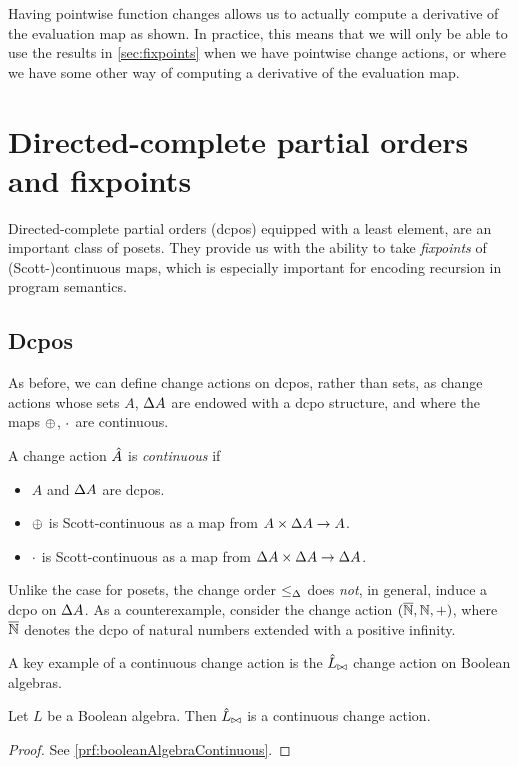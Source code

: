 Having pointwise function changes allows us to actually compute a derivative of the
evaluation map as shown. In practice, this means
that we will only be able to use the results in \cref{sec:fixpoints} when
we have pointwise change actions, or where we have some other way of computing
a derivative of the evaluation map. 

\section{Directed-complete partial orders and fixpoints}

Directed-complete partial orders (dcpos) equipped with a least element, are an
important class of posets. They provide us with the ability to take
\emph{fixpoints} of (Scott-)continuous maps, which is especially important for
encoding recursion in program semantics.

\subsection{Dcpos}
\label{sec:dcpos}

As before, we can define change actions on dcpos, rather than sets, as change
actions whose sets $A$, $\Delta A$ are endowed with a dcpo structure, and where
the maps $\oplus$, $\cdot$ are continuous.

\begin{defn}
  A change action $\hat{A}$ is \emph{continuous} if
  \begin{itemize}
    \item $A$ and $\Delta A$ are dcpos.
    \item $\oplus$ is Scott-continuous as a map from $A \times \Delta A \rightarrow A$.
    \item $\cdot$ is Scott-continuous as a map from $\Delta A \times \Delta A \rightarrow \Delta A$.
  \end{itemize}
\end{defn}

Unlike the case for posets, the change order $\leq_\Delta$ does \emph{not}, in general,
induce a dcpo on $\Delta A$. As a counterexample, consider 
the change action $(\overline{\mathbb{N}}, \mathbb{N}, +)$, where $\overline{\mathbb{N}}$ denotes the dcpo of natural numbers
extended with a positive infinity.

A key example of a continuous change action is the $\hat{L}_{\bowtie}$ change
action on Boolean algebras.

\begin{prop}[name=Boolean algebra continuity, restate=booleanAlgebraContinuous]
  \label{prop:booleanAlgebraContinuous}
  Let $L$ be a Boolean algebra. Then $\hat{L}_{\bowtie}$ is a continuous
  change action.
\end{prop}
\ifproofs
\begin{proof}
  See \cref{prf:booleanAlgebraContinuous}.
\end{proof}
\fi

